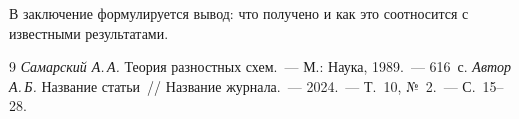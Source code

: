 \documentclass[12pt, a4paper]{article}
\theoremstyle{plain}
\begin{document}
В заключение формулируется вывод: что получено и как это соотносится
с известными результатами.

\vspace{0.8em}

\begin{thebibliography}{9}
  \footnotesize
   \emph{Самарский А.\,А.} Теория разностных схем.~---
    М.: Наука, 1989.~--- 616~с.
   \emph{Автор А.\,Б.} Название статьи~// Название журнала.~---
    2024.~--- Т.~10, №~2.~--- С.~15--28.
\end{thebibliography}
\end{document}
